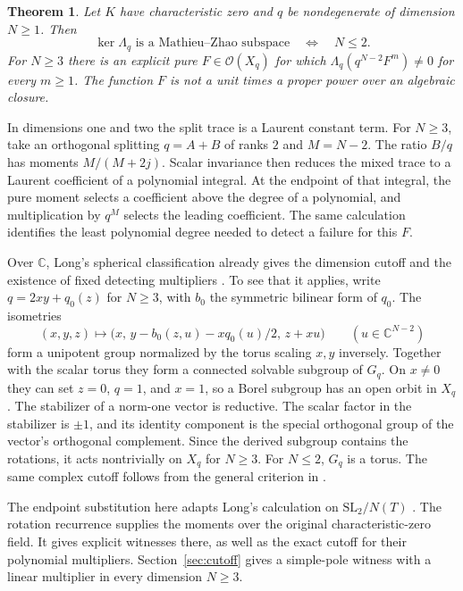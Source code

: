 \documentclass[11pt]{article}
\newtheorem{theorem}{Theorem}
\newcommand{\Lq}{\Lambda_q}
\begin{document}
\begin{theorem}\label{thm:main}
Let \(K\) have characteristic zero and \(q\) be nondegenerate of
dimension \(N\ge1\). Then
\[
   \boxed{\ker\Lq\text{ is a Mathieu--Zhao subspace}
          \quad\Longleftrightarrow\quad N\le2.}
\]
For \(N\ge3\) there is an explicit pure \(F\in\mathcal O(X_q)\) for
which \(\Lq(q^{N-2}F^m)\ne0\) for every \(m\ge1\). The function \(F\)
is not a unit times a proper power over an algebraic closure.
\end{theorem}

In dimensions one and two the split trace is a Laurent constant term.
For \(N\ge3\), take an orthogonal splitting \(q=A+B\) of ranks \(2\)
and \(M=N-2\). The ratio \(B/q\) has moments \(M/(M+2j)\).
Scalar invariance then reduces the mixed trace to a Laurent
coefficient of a polynomial integral. At the endpoint of that
integral, the pure moment selects a coefficient above the degree
of a polynomial, and multiplication by \(q^M\) selects the leading
coefficient. The same calculation identifies the least polynomial
degree needed to detect a failure for this \(F\).

Over \(\mathbb C\), Long's spherical classification already gives the
dimension cutoff and the existence of fixed detecting multipliers
\cite[Thm.~1.1]{Long}. To see that it applies, write
\(q=2xy+q_0(z)\) for \(N\ge3\), with \(b_0\) the symmetric bilinear
form of \(q_0\). The isometries
\[
 (x,y,z)\longmapsto
 \bigl(x,\,y-b_0(z,u)-xq_0(u)/2,\,z+xu\bigr)
 \qquad(u\in\mathbb C^{N-2})
\]
form a unipotent group normalized by the torus scaling \(x,y\)
inversely. Together with the scalar torus they form a connected
solvable subgroup of \(G_q\). On \(x\ne0\) they can set \(z=0\),
\(q=1\), and \(x=1\), so a Borel subgroup has an open orbit in \(X_q\).
The stabilizer of a norm-one vector is reductive. The scalar factor in
the stabilizer is \(\pm1\), and its identity component is the special
orthogonal group of the vector's orthogonal complement. Since the
derived subgroup contains the rotations, it acts nontrivially on
\(X_q\) for \(N\ge3\). For \(N\le2\), \(G_q\) is a torus.
The same complex cutoff follows from the general criterion in
\cite[Thm.~1.1]{vanRijn}.

The endpoint substitution here adapts Long's calculation on
\(\mathrm{SL}_2/N(T)\) \cite[Prop.~5.1]{Long}. The rotation recurrence
supplies the moments over the original characteristic-zero field.
It gives explicit witnesses there, as well as the exact cutoff for
their polynomial multipliers. Section~\ref{sec:cutoff} gives a simple-pole witness with a linear multiplier in every dimension \(N\ge3\).
\end{document}
